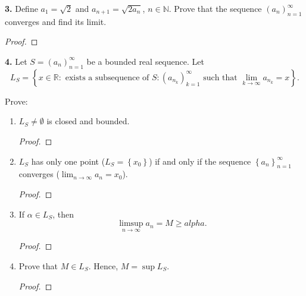 \documentclass{article}
\newcommand{\R}{\mathbb{R}}
\newcommand{\N}{\mathbb{N}}
\newcommand{\set}[1]{\left\{ #1 \right\}}
\begin{document}
\newpage %

\textbf{3. }
Define $a_1 = \sqrt{2}$ and $a_{n + 1} = \sqrt{2 a_n}$, $n \in \N$. Prove that the sequence $(a_n)_{n = 1}^\infty$ converges and find its limit.

\begin{proof}
    
\end{proof}


\newpage %


\textbf{4. }
Let $S = (a_n)_{n = 1}^\infty$ be a bounded real sequence. Let
$$L_S = \set{x \in \R : \text{ exists a subsequence of } S : (a_{n_k})_{k = 1}^\infty \text{ such that } \lim_{k \to \infty} a_{n_k} = x}.$$

Prove:
\begin{enumerate}
    \item 
    $L_S \ne \emptyset$ is closed and bounded.
    \begin{proof}
        
    \end{proof}


    \item 
    $L_S$ has only one point ($L_S = \set{x_0}$) if and only if the sequence $\set{a_n}_{n = 1}^\infty$ converges ($\lim_{n \to \infty} a_n = x_0$).
    \begin{proof}
        
    \end{proof}


    \item 
    If $\alpha \in L_S$, then
    $$\limsup_{n \to \infty} a_n = M \ge alpha.$$
    \begin{proof}
        
    \end{proof}


    \item 
    Prove that $M \in L_S$. Hence, $M = \sup L_S$.
    \begin{proof}
        
    \end{proof}

\end{enumerate}
\end{document}
